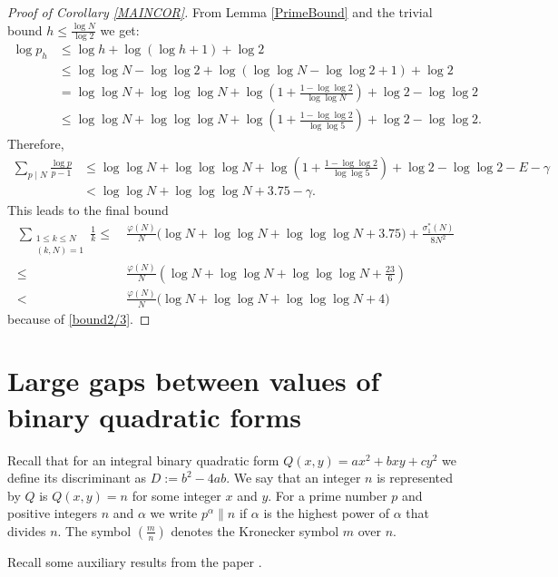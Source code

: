 \documentclass[a4paper]{amsart}
\newcommand{\1}{\mathbbm{1}}
\begin{document}
\begin{proof}[Proof of Corollary \ref{MAINCOR}]
From Lemma \ref{PrimeBound} and the trivial bound $h\leq \frac{\log N}{\log 2}$ we get:
\begin{align*}
\log p_{h} & \leq  \log h+\log(\log h +1) + \log 2 \\
& \leq \log\log N - \log\log 2 + \log\left(\log\log N - \log\log 2 +1\right) + \log 2 \\
& = \log\log N + \log\log\log N + \log\left(1 + \frac{1-\log\log 2}{\log\log N}\right) + \log 2 - \log\log 2 \\
& \leq \log\log N + \log\log\log N + \log\left(1 + \frac{1-\log\log 2}{\log\log 5}\right) + \log 2 - \log\log 2.
\end{align*}
Therefore,
\begin{align*}
\sum_{p\mid N}\frac{\log p}{p-1} & \leq \log\log N+\log\log\log N + \log\left(1 + \frac{1-\log\log 2}{\log\log 5}\right) + \log 2 - \log\log 2-E-\gamma \\
& < \log\log N+\log\log\log N + 3.75 -\gamma.
\end{align*}
This leads to the final bound 
\begin{align*}
\sum_{\substack{1\leq k\leq N \\ (k,N)=1}} \frac{1}{k} \leq &\ \frac{\varphi (N)}{N}\big(\log N+\log\log N +\log\log\log N +3.75\big) +\frac{\sigma_{1}^{*}(N)}{8N^{2}} \\
 \leq  &\  \frac{\varphi (N)}{N}\left(\log N+\log\log N +\log\log\log N + \frac{23}{6} \right) \\
 < &\ \frac{\varphi (N)}{N}\big(\log N+\log\log N +\log\log\log N + 4 \big)
\end{align*}
because of \eqref{bound2/3}.
\end{proof}



\section{Large gaps between values of binary quadratic forms}

Recall that for an integral binary quadratic form $Q(x,y)=ax^{2}+bxy+cy^{2}$ we define its discriminant as $D:=b^{2}-4ab$. We say that an integer $n$ is represented by $Q$ is $Q(x,y)=n$ for some integer $x$ and $y$. For a prime number $p$ and positive integers $n$ and $\alpha$ we write $p^{\alpha}\| n$ if $\alpha$ is the highest power of $\alpha$ that divides $n$. The symbol $\left(\frac{m}{n}\right)$ denotes the Kronecker symbol $m$ over $n$.

Recall some auxiliary results from the paper \cite{MS}.
\end{document}
